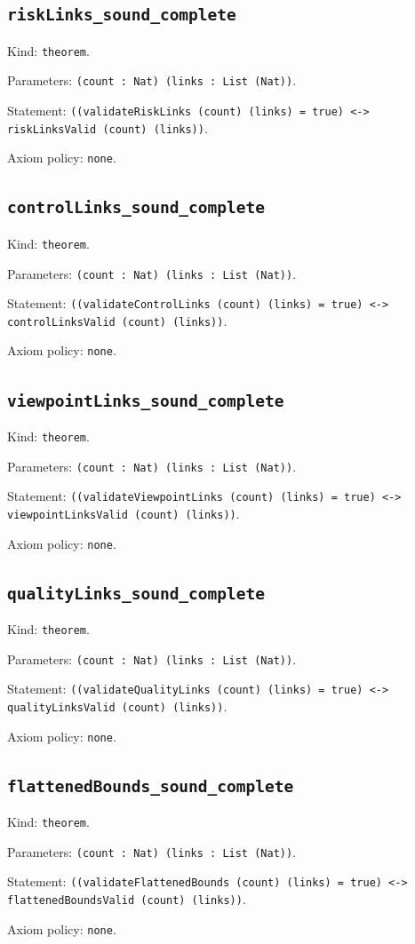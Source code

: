 \documentclass[11pt]{article}
\begin{document}
\subsection*{\texttt{riskLinks\_sound\_complete}}
\noindent Kind: \texttt{theorem}.\par
\noindent Parameters: \texttt{(count : Nat) (links : List (Nat))}.\par
\noindent Statement: \texttt{((validateRiskLinks (count) (links) = true) <-> riskLinksValid (count) (links))}.\par
\noindent Axiom policy: \texttt{none}.\par
\subsection*{\texttt{controlLinks\_sound\_complete}}
\noindent Kind: \texttt{theorem}.\par
\noindent Parameters: \texttt{(count : Nat) (links : List (Nat))}.\par
\noindent Statement: \texttt{((validateControlLinks (count) (links) = true) <-> controlLinksValid (count) (links))}.\par
\noindent Axiom policy: \texttt{none}.\par
\subsection*{\texttt{viewpointLinks\_sound\_complete}}
\noindent Kind: \texttt{theorem}.\par
\noindent Parameters: \texttt{(count : Nat) (links : List (Nat))}.\par
\noindent Statement: \texttt{((validateViewpointLinks (count) (links) = true) <-> viewpointLinksValid (count) (links))}.\par
\noindent Axiom policy: \texttt{none}.\par
\subsection*{\texttt{qualityLinks\_sound\_complete}}
\noindent Kind: \texttt{theorem}.\par
\noindent Parameters: \texttt{(count : Nat) (links : List (Nat))}.\par
\noindent Statement: \texttt{((validateQualityLinks (count) (links) = true) <-> qualityLinksValid (count) (links))}.\par
\noindent Axiom policy: \texttt{none}.\par
\subsection*{\texttt{flattenedBounds\_sound\_complete}}
\noindent Kind: \texttt{theorem}.\par
\noindent Parameters: \texttt{(count : Nat) (links : List (Nat))}.\par
\noindent Statement: \texttt{((validateFlattenedBounds (count) (links) = true) <-> flattenedBoundsValid (count) (links))}.\par
\noindent Axiom policy: \texttt{none}.\par
\end{document}

